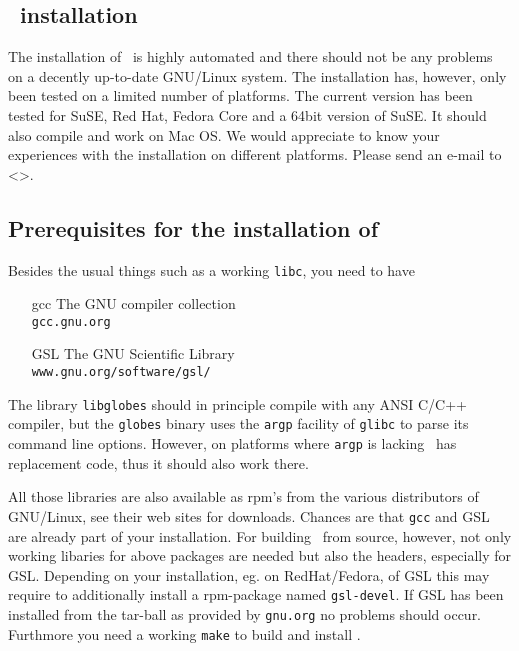 
\begin{appendix}

\chapter{\GLOBES\ installation}
\label{app:installation}


The installation of \GLOBES\ is highly automated and there should not be
any problems on a decently up-to-date GNU/Linux system. The installation
has, however, only been tested on a limited number of platforms. The 
current version has been tested for SuSE, Red Hat, Fedora Core and
a 64bit version of SuSE. It should also compile and work on Mac OS. We 
would appreciate to know your experiences with the installation on different platforms.
Please send an e-mail to <\bugs>.

\section*{Prerequisites for the installation of \GLOBES}

Besides the usual things such as a working \verb`libc`, you need to have
\begin{itemize}
\item[gcc] The GNU compiler collection\\
\verb+gcc.gnu.org+
\item[GSL] The GNU Scientific Library\\
\verb+www.gnu.org/software/gsl/+
\end{itemize}
The library \verb+libglobes+ should in principle compile with any
ANSI C/C++ compiler, but the \verb+globes+ binary uses the 
\verb+argp+ facility of \verb+glibc+ to parse its command line options.
However, on platforms where \verb+argp+ is lacking \GLOBES\ has replacement code, 
thus it should also work there.

All those libraries are also available as rpm's from the various
distributors of GNU/Linux, see their web sites for downloads. Chances are 
that \verb+gcc+ and GSL are already part of your installation.  For building \GLOBES\ 
from source, however, not only working libaries for above packages are 
needed but also the headers,  especially for GSL. Depending on your
installation, eg. on RedHat/Fedora, of GSL this may require to additionally 
install a rpm-package named \verb+gsl-devel+. If GSL has been installed from the 
tar-ball as provided by \verb`gnu.org` no problems should occur. Furthmore you need 
a working \verb+make+ to build and install \GLOBES.


\end{appendix}
